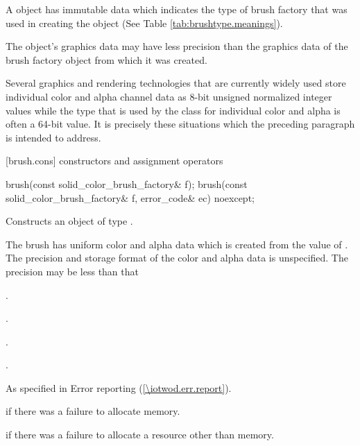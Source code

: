\pnum
A  object has immutable  data which indicates the type of brush factory that was used in creating the  object (See Table \ref{tab:brushtype.meanings}).

\pnum
The  object's graphics data may have less precision than the graphics data of the brush factory object from which it was created.

\pnum
\enterexample
Several graphics and rendering technologies that are currently widely used store individual color and alpha channel data as 8-bit unsigned normalized integer values while the  type that is used by the  class for individual color and alpha is often a 64-bit value. It is precisely these situations which the preceding paragraph is intended to address.
\exitexample

 [brush.cons] { constructors and assignment operators}

\begin{itemdecl}
brush(const solid_color_brush_factory& f);
brush(const solid_color_brush_factory& f, error_code& ec) noexcept;
\end{itemdecl}
\begin{itemdescr}
\pnum
\effects
Constructs an object of type .

\pnum
The brush has uniform color and alpha data which is created from the value of . The precision and storage format of the color and alpha data is unspecified. The precision may be less than that  

\pnum
\postconditions
{}.

.

.

.

\pnum
\throws
As specified in Error reporting (\ref{\iotwod.err.report}).

\pnum
\errors
{} if there was a failure to allocate memory.

 if there was a failure to allocate a resource other than memory.
\end{itemdescr}

